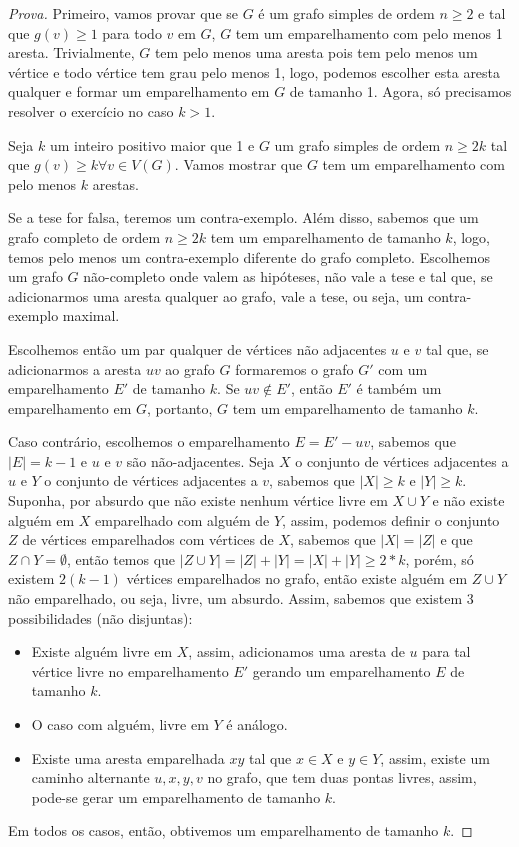 \documentclass[12pt]{article}
\begin{document}
\begin{proof}[Prova]
Primeiro, vamos provar que se $G$ é um grafo simples de ordem $n \geq 2$ e tal que $g(v) \geq 1$ para todo $v$ em $G$, $G$ tem um emparelhamento com pelo menos 1 aresta. Trivialmente, $G$ tem pelo menos uma aresta pois tem pelo menos um vértice e todo vértice tem grau pelo menos 1, logo, podemos escolher esta aresta qualquer e formar um emparelhamento em $G$ de tamanho 1. Agora, só precisamos resolver o exercício no caso $k > 1$.

Seja $k$ um inteiro positivo maior que  1 e $G$ um grafo simples de ordem $n \geq 2k$ tal que $g(v) \geq k \forall v \in V(G)$. Vamos mostrar que $G$ tem um emparelhamento com pelo menos $k$ arestas.

Se a tese for falsa, teremos um contra-exemplo. Além disso, sabemos que um grafo completo de ordem $n \geq 2k$ tem um emparelhamento de tamanho $k$, logo, temos pelo menos um contra-exemplo diferente do grafo completo. Escolhemos um grafo $G$ não-completo onde valem as hipóteses, não vale a tese e tal que, se adicionarmos uma aresta qualquer ao grafo, vale a tese, ou seja, um contra-exemplo maximal.

Escolhemos então um par qualquer de vértices não adjacentes $u$ e $v$ tal que, se adicionarmos a aresta $uv$ ao grafo $G$ formaremos o grafo $G'$ com um emparelhamento $E'$ de tamanho $k$. Se $uv \notin E'$, então $E'$ é também um emparelhamento em $G$, portanto, $G$ tem um emparelhamento de tamanho $k$.

Caso contrário, escolhemos o emparelhamento $E = E' - uv$, sabemos que $|E| = k-1$ e $u$ e $v$ são não-adjacentes. Seja $X$ o conjunto de vértices adjacentes a $u$ e $Y$ o conjunto de vértices adjacentes a $v$, sabemos que $|X| \geq k$ e $|Y| \geq k$. Suponha, por absurdo que não existe nenhum vértice livre em $X \cup Y$ e não existe alguém em $X$ emparelhado com alguém de $Y$, assim, podemos definir o conjunto $Z$ de vértices emparelhados com vértices de $X$, sabemos que $|X| = |Z|$ e que $Z \cap Y = \emptyset$, então temos que $|Z \cup Y| = |Z| + |Y| = |X| + |Y| \geq 2*k$, porém, só existem $2(k-1)$ vértices emparelhados no grafo, então existe alguém em $Z \cup Y$ não emparelhado, ou seja, livre, um absurdo. Assim, sabemos que existem 3 possibilidades (não disjuntas):

\begin{itemize}
    \item Existe alguém livre em $X$, assim, adicionamos uma aresta de $u$ para tal vértice livre no emparelhamento $E'$ gerando um emparelhamento $E$ de tamanho $k$.
    \item O caso com alguém, livre em $Y$ é análogo.
    \item Existe uma aresta emparelhada $xy$ tal que $x \in X$ e $y \in Y$, assim, existe um caminho alternante $u, x, y, v$ no grafo, que tem duas pontas livres, assim, pode-se gerar um emparelhamento de tamanho $k$.
\end{itemize}

Em todos os casos, então, obtivemos um emparelhamento de tamanho $k$.
\end{proof}
\end{document}
